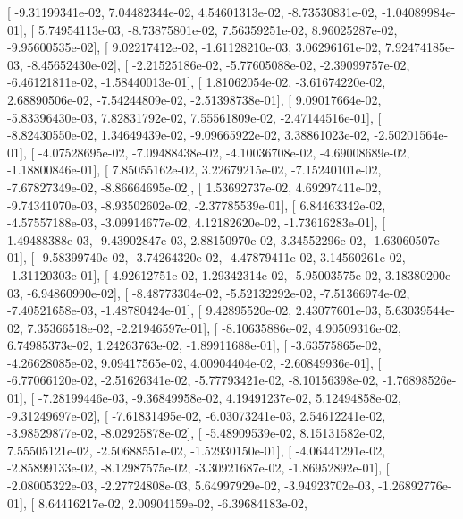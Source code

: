 \documentclass{article}
\begin{document}
       [ -9.31199341e-02,   7.04482344e-02,   4.54601313e-02,
         -8.73530831e-02,  -1.04089984e-01],
       [  5.74954113e-03,  -8.73875801e-02,   7.56359251e-02,
          8.96025287e-02,  -9.95600535e-02],
       [  9.02217412e-02,  -1.61128210e-03,   3.06296161e-02,
          7.92474185e-03,  -8.45652430e-02],
       [ -2.21525186e-02,  -5.77605088e-02,  -2.39099757e-02,
         -6.46121811e-02,  -1.58440013e-01],
       [  1.81062054e-02,  -3.61674220e-02,   2.68890506e-02,
         -7.54244809e-02,  -2.51398738e-01],
       [  9.09017664e-02,  -5.83396430e-03,   7.82831792e-02,
          7.55561809e-02,  -2.47144516e-01],
       [ -8.82430550e-02,   1.34649439e-02,  -9.09665922e-02,
          3.38861023e-02,  -2.50201564e-01],
       [ -4.07528695e-02,  -7.09488438e-02,  -4.10036708e-02,
         -4.69008689e-02,  -1.18800846e-01],
       [  7.85055162e-02,   3.22679215e-02,  -7.15240101e-02,
         -7.67827349e-02,  -8.86664695e-02],
       [  1.53692737e-02,   4.69297411e-02,  -9.74341070e-03,
         -8.93502602e-02,  -2.37785539e-01],
       [  6.84463342e-02,  -4.57557188e-03,  -3.09914677e-02,
          4.12182620e-02,  -1.73616283e-01],
       [  1.49488388e-03,  -9.43902847e-03,   2.88150970e-02,
          3.34552296e-02,  -1.63060507e-01],
       [ -9.58399740e-02,  -3.74264320e-02,  -4.47879411e-02,
          3.14560261e-02,  -1.31120303e-01],
       [  4.92612751e-02,   1.29342314e-02,  -5.95003575e-02,
          3.18380200e-03,  -6.94860990e-02],
       [ -8.48773304e-02,  -5.52132292e-02,  -7.51366974e-02,
         -7.40521658e-03,  -1.48780424e-01],
       [  9.42895520e-02,   2.43077601e-03,   5.63039544e-02,
          7.35366518e-02,  -2.21946597e-01],
       [ -8.10635886e-02,   4.90509316e-02,   6.74985373e-02,
          1.24263763e-02,  -1.89911688e-01],
       [ -3.63575865e-02,  -4.26628085e-02,   9.09417565e-02,
          4.00904404e-02,  -2.60849936e-01],
       [ -6.77066120e-02,  -2.51626341e-02,  -5.77793421e-02,
         -8.10156398e-02,  -1.76898526e-01],
       [ -7.28199446e-03,  -9.36849958e-02,   4.19491237e-02,
          5.12494858e-02,  -9.31249697e-02],
       [ -7.61831495e-02,  -6.03073241e-03,   2.54612241e-02,
         -3.98529877e-02,  -8.02925878e-02],
       [ -5.48909539e-02,   8.15131582e-02,   7.55505121e-02,
         -2.50688551e-02,  -1.52930150e-01],
       [ -4.06441291e-02,  -2.85899133e-02,  -8.12987575e-02,
         -3.30921687e-02,  -1.86952892e-01],
       [ -2.08005322e-03,  -2.27724808e-03,   5.64997929e-02,
         -3.94923702e-03,  -1.26892776e-01],
       [  8.64416217e-02,   2.00904159e-02,  -6.39684183e-02,
\end{document}
